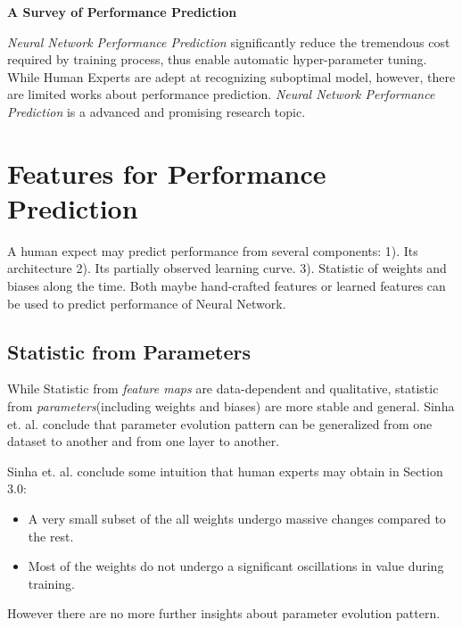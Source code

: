 \documentclass{mcmthesis}
\begin{document}
\begin{center}
	\textbf{\LARGE{A Survey of Performance Prediction}} \\
	\vspace{0.2em}
\end{center}

\textit{Neural Network Performance Prediction} significantly reduce the tremendous cost required by training process, thus enable automatic hyper-parameter tuning. While Human Experts are adept at recognizing suboptimal model, however, there are limited works about performance prediction. \textit{Neural Network Performance Prediction} is a advanced and promising  research topic.

\section{Features for Performance Prediction} 
A human expect may predict performance from several components: 1). Its architecture 2). Its partially observed learning curve. 3). Statistic of weights and biases along the time. Both maybe hand-crafted features or learned features can be used to predict performance of Neural Network.
\subsection{Statistic from Parameters}
While Statistic from \textit{feature maps}  are data-dependent and qualitative,  statistic from \textit{parameters}(including weights and biases) are more stable and general.  Sinha et. al. \cite{sinha2017introspection}  conclude that parameter evolution pattern can be generalized from one dataset to another and from one layer to another.  

Sinha et. al. \cite{sinha2017introspection} conclude some intuition that human experts may obtain in Section 3.0:
\begin{itemize}[noitemsep]%
	\item A very small subset of the all weights undergo massive changes compared to the rest. 
	\item Most of the weights do not undergo a significant oscillations in value during training.
\end{itemize}
However there are no more further insights about parameter evolution pattern. 
\end{document}
